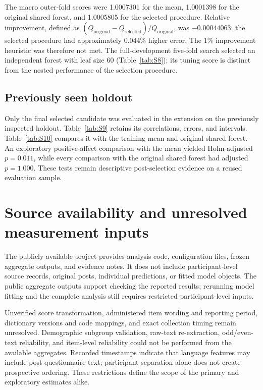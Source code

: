 

The macro outer-fold scores were 1.0007301 for the mean, 1.0001398 for the original shared forest, and 1.0005805 for the selected procedure. Relative improvement, defined as $(Q_{\mathrm{original}}-Q_{\mathrm{selected}})/Q_{\mathrm{original}}$, was $-0.00044063$: the selected procedure had approximately 0.044\% higher error. The 1\% improvement heuristic was therefore not met. The full-development five-fold search selected an independent forest with leaf size 60 (Table~\ref{tab:S8}); its tuning score is distinct from the nested performance of the selection procedure.



\subsection{Previously seen holdout}
Only the final selected candidate was evaluated in the extension on the previously inspected holdout. Table~\ref{tab:S9} retains its correlations, errors, and intervals. Table~\ref{tab:S10} compares it with the training mean and original shared forest. An exploratory positive-affect comparison with the mean yielded Holm-adjusted $p=0.011$, while every comparison with the original shared forest had adjusted $p=1.000$. These tests remain descriptive post-selection evidence on a reused evaluation sample.



\FloatBarrier

\section{Source availability and unresolved measurement inputs}
The publicly available project provides analysis code, configuration files, frozen aggregate outputs, and evidence notes. It does not include participant-level source records, original posts, individual predictions, or fitted model objects. The public aggregate outputs support checking the reported results; rerunning model fitting and the complete analysis still requires restricted participant-level inputs.

Unverified score transformation, administered item wording and reporting period, dictionary versions and code mappings, and exact collection timing remain unresolved. Demographic subgroup validation, raw-text re-extraction, odd/even-text reliability, and item-level reliability could not be performed from the available aggregates. Recorded timestamps indicate that language features may include post-questionnaire text; participant separation alone does not create prospective ordering. These restrictions define the scope of the primary and exploratory estimates alike.



